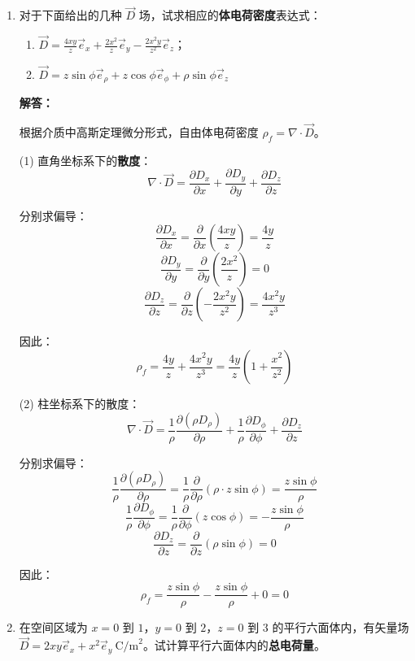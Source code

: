 \begin{enumerate}[label=\arabic*.]
\item 对于下面给出的几种 \(\vec{D}\) 场，试求相应的\textbf{体电荷密度}表达式：
\begin{enumerate}
    \item \(\displaystyle \vec{D} = \frac{4xy}{z}\vec{e}_x + \frac{2x^2}{z}\vec{e}_y - \frac{2x^2y}{z^2}\vec{e}_z\)；
    \item \(\displaystyle \vec{D} = z\sin\phi\vec{e}_\rho + z\cos\phi\vec{e}_\phi + \rho\sin\phi\vec{e}_z\)
\end{enumerate}

\textbf{解答：}

根据介质中高斯定理微分形式，自由体电荷密度 \(\rho_f = \nabla \cdot \vec{D}\)。

\vspace{0.5em}
(1) 直角坐标系下的\textbf{散度}：
\[
\nabla \cdot \vec{D} = \frac{\partial D_x}{\partial x} + \frac{\partial D_y}{\partial y} + \frac{\partial D_z}{\partial z}
\]

分别求偏导：
\[
\frac{\partial D_x}{\partial x} = \frac{\partial}{\partial x}\left( \frac{4xy}{z} \right) = \frac{4y}{z}
\]
\[
\frac{\partial D_y}{\partial y} = \frac{\partial}{\partial y}\left( \frac{2x^2}{z} \right) = 0
\]
\[
\frac{\partial D_z}{\partial z} = \frac{\partial}{\partial z}\left( -\frac{2x^2y}{z^2} \right) = \frac{4x^2y}{z^3}
\]

因此：
\[
\rho_f = \frac{4y}{z} + \frac{4x^2y}{z^3} = \frac{4y}{z}\left( 1 + \frac{x^2}{z^2} \right)
\]

\vspace{0.5em}
(2) 柱坐标系下的散度：
\[
\nabla \cdot \vec{D} = \frac{1}{\rho}\frac{\partial (\rho D_\rho)}{\partial \rho} + \frac{1}{\rho}\frac{\partial D_\phi}{\partial \phi} + \frac{\partial D_z}{\partial z}
\]

分别求偏导：
\[
\frac{1}{\rho}\frac{\partial (\rho D_\rho)}{\partial \rho} = \frac{1}{\rho}\frac{\partial}{\partial \rho}\left( \rho \cdot z\sin\phi \right) = \frac{z\sin\phi}{\rho}
\]
\[
\frac{1}{\rho}\frac{\partial D_\phi}{\partial \phi} = \frac{1}{\rho}\frac{\partial}{\partial \phi}\left( z\cos\phi \right) = -\frac{z\sin\phi}{\rho}
\]
\[
\frac{\partial D_z}{\partial z} = \frac{\partial}{\partial z}\left( \rho\sin\phi \right) = 0
\]

因此：
\[
\rho_f = \frac{z\sin\phi}{\rho} - \frac{z\sin\phi}{\rho} + 0 = 0
\]

\vspace{1em}

\item 在空间区域为 \(x=0\) 到 \(1\)，\(y=0\) 到 \(2\)，\(z=0\) 到 \(3\) 的平行六面体内，有矢量场 \(\vec{D} = 2xy\vec{e}_x + x^2\vec{e}_y\ \text{C/m}^2\)。试计算平行六面体内的\textbf{总电荷量}。


\end{enumerate}
